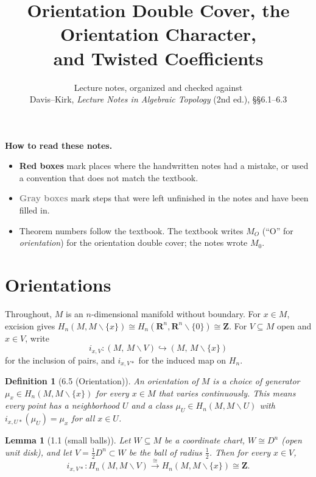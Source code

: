 \documentclass[11pt]{article}
\title{\vspace{-1.5em}Orientation Double Cover, the Orientation Character,\\
and Twisted Coefficients}
\author{Lecture notes, organized and checked against\\
Davis--Kirk, \emph{Lecture Notes in Algebraic Topology} (2nd ed.), \S\S6.1--6.3}
\date{}
\newcommand{\Z}{\mathbf{Z}}
\newcommand{\R}{\mathbf{R}}
\newcommand{\MO}{M_O}
\newcommand{\minus}{\smallsetminus}
\newcommand{\iso}{\cong}
\theoremstyle{namedit}
\newtheorem{lem}{Lemma}
\theoremstyle{namedrm}
\newtheorem{defn}{Definition}
\begin{document}
\maketitle
\vspace{-1.5em}

\noindent\textbf{How to read these notes.}
\begin{itemize}
  \item \textcolor{red!55!black}{\textbf{Red boxes}} mark places where the handwritten notes had a mistake,
        or used a convention that does not match the textbook.
  \item \textcolor{gray}{\textbf{Gray boxes}} mark steps that were left unfinished in the notes and have been filled in.
  \item Theorem numbers follow the textbook. The textbook writes $\MO$ (``O'' for
        \emph{orientation}) for the orientation double cover; the notes wrote $M_0$.
\end{itemize}

\tableofcontents

\section{Orientations}

Throughout, $M$ is an $n$-dimensional manifold without boundary. For $x\in M$, excision gives
$H_n(M,M\minus\{x\})\iso H_n(\R^n,\R^n\minus\{0\})\iso\Z$.
For $V\subseteq M$ open and $x\in V$, write
\[
  i_{x,V}\colon (M,\,M\minus V)\hookrightarrow (M,\,M\minus\{x\})
\]
for the inclusion of pairs, and $i_{x,V*}$ for the induced map on $H_n$.

\begin{defn}[6.5 (Orientation)]
An \emph{orientation} of $M$ is a choice of generator $\mu_x\in H_n(M,M\minus\{x\})$ for every
$x\in M$ that \emph{varies continuously}. This means every point has a neighborhood $U$ and a
class $\mu_U\in H_n(M,M\minus U)$ with $i_{x,U*}(\mu_U)=\mu_x$ for all $x\in U$.
\end{defn}

\begin{lem}[1.1 (small balls)]\label{lem:ball}
Let $W\subseteq M$ be a coordinate chart, $W\iso D^n$ (open unit disk), and let
$V=\tfrac12 D^n\subset W$ be the ball of radius $\tfrac12$. Then for every $x\in V$,
\[
  i_{x,V*}\colon H_n(M,M\minus V)\xrightarrow{\ \iso\ } H_n(M,M\minus\{x\})\iso\Z .
\]
\end{lem}
\end{document}

